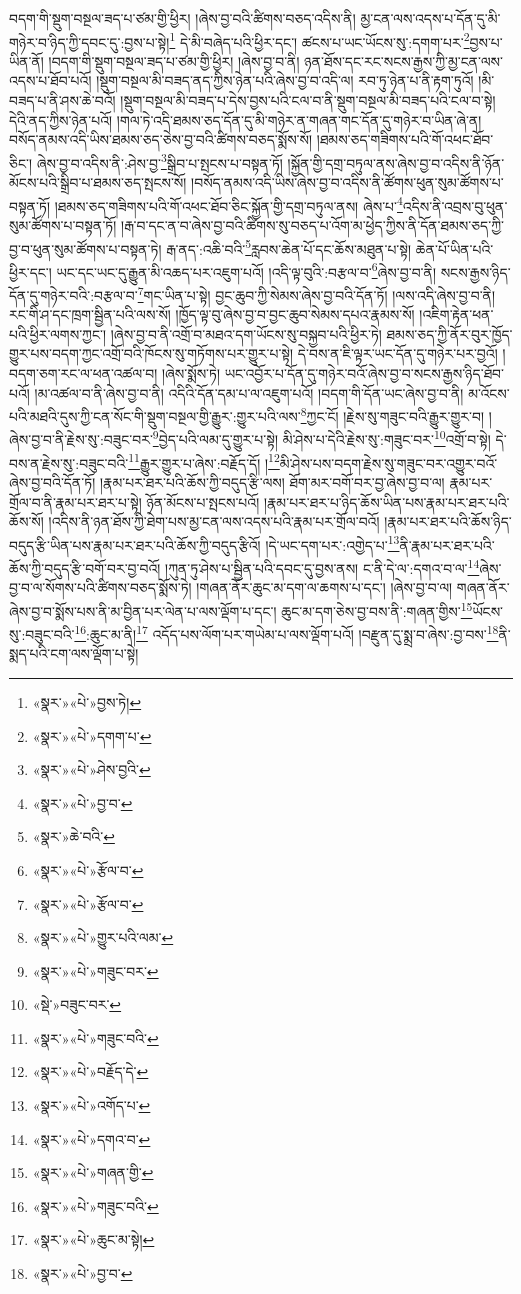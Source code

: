 བདག་གི་སྡུག་བསྔལ་ཟད་པ་ཙམ་གྱི་ཕྱིར། །ཞེས་བྱ་བའི་ཚིགས་བཅད་འདིས་ནི། མྱ་ངན་ལས་འདས་པ་དོན་དུ་མི་གཉེར་བ་ཉིད་ཀྱི་དབང་དུ་:བྱས་པ་སྟེ།\footnote{«སྣར་»«པེ་»བྱས་ཏེ།} དེ་མི་བཞེད་པའི་ཕྱིར་དང་། ཚངས་པ་ཡང་ཡོངས་སུ་:དགག་པར་\footnote{«སྣར་»«པེ་»དགག་པ་}བྱས་པ་ཡིན་ནོ། །བདག་གི་སྡུག་བསྔལ་ཟད་པ་ཙམ་གྱི་ཕྱིར། །ཞེས་བྱ་བ་ནི། ཉན་ཐོས་དང་རང་སངས་རྒྱས་ཀྱི་མྱ་ངན་ལས་འདས་པ་ཐོབ་པའོ། །སྡུག་བསྔལ་མི་བཟད་ནད་ཀྱིས་ཉེན་པའི་ཞེས་བྱ་བ་འདི་ལ། རབ་ཏུ་ཉེན་པ་ནི་རྟག་ཏུའོ། །མི་བཟད་པ་ནི་ཤས་ཆེ་བའོ། །སྡུག་བསྔལ་མི་བཟད་པ་དེས་བྱས་པའི་ངལ་བ་ནི་སྡུག་བསྔལ་མི་བཟད་པའི་ངལ་བ་སྟེ། དེའི་ནད་ཀྱིས་ཉེན་པའོ། །གལ་ཏེ་འདི་ཐམས་ཅད་དོན་དུ་མི་གཉེར་ན་གཞན་གང་དོན་དུ་གཉེར་བ་ཡིན་ཞེ་ན། བསོད་ནམས་འདི་ཡིས་ཐམས་ཅད་ཅེས་བྱ་བའི་ཚིགས་བཅད་སྨོས་སོ། །ཐམས་ཅད་གཟིགས་པའི་གོ་འཕང་ཐོབ་ཅིང་། ཞེས་བྱ་བ་འདིས་ནི་:ཤེས་བྱ་\footnote{«སྣར་»«པེ་»ཤེས་བྱའི་}སྒྲིབ་པ་སྤངས་པ་བསྟན་ཏོ། །སྐྱོན་གྱི་དགྲ་བཏུལ་ནས་ཞེས་བྱ་བ་འདིས་ནི་ཉོན་མོངས་པའི་སྒྲིབ་པ་ཐམས་ཅད་སྤངས་སོ། །བསོད་ནམས་འདི་ཡིས་ཞེས་བྱ་བ་འདིས་ནི་ཚོགས་ཕུན་སུམ་ཚོགས་པ་བསྟན་ཏོ། །ཐམས་ཅད་གཟིགས་པའི་གོ་འཕང་ཐོབ་ཅིང་སྐྱོན་གྱི་དགྲ་བཏུལ་ནས། ཞེས་པ་\footnote{«སྣར་»«པེ་»བྱ་བ་}འདིས་ནི་འབྲས་བུ་ཕུན་སུམ་ཚོགས་པ་བསྟན་ཏོ། །རྒ་བ་དང་ན་བ་ཞེས་བྱ་བའི་ཚིགས་སུ་བཅད་པ་འོག་མ་ཕྱེད་ཀྱིས་ནི་དོན་ཐམས་ཅད་ཀྱི་བྱ་བ་ཕུན་སུམ་ཚོགས་པ་བསྟན་ཏེ། རྒ་ནད་:འཆི་བའི་\footnote{«སྣར་»ཆེ་བའི་}རླབས་ཆེན་པོ་དང་ཆོས་མཐུན་པ་སྟེ། ཆེན་པོ་ཡིན་པའི་ཕྱིར་དང་། ཡང་དང་ཡང་དུ་རྒྱུན་མི་འཆད་པར་འཇུག་པའོ། །འདི་ལྟ་བུའི་:བརྩལ་བ་\footnote{«སྣར་»«པེ་»རྩོལ་བ་}ཞེས་བྱ་བ་ནི། སངས་རྒྱས་ཉིད་དོན་དུ་གཉེར་བའི་:བརྩལ་བ་\footnote{«སྣར་»«པེ་»རྩོལ་བ་}གང་ཡིན་པ་སྟེ། བྱང་ཆུབ་ཀྱི་སེམས་ཞེས་བྱ་བའི་དོན་ཏོ། །ལས་འདི་ཞེས་བྱ་བ་ནི། རང་གི་ཤ་དང་ཁྲག་སྦྱིན་པའི་ལས་སོ། །ཁྱོད་ལྟ་བུ་ཞེས་བྱ་བ་བྱང་ཆུབ་སེམས་དཔའ་རྣམས་སོ། །འཇིག་རྟེན་ཕན་པའི་ཕྱིར་ལགས་ཀྱང་། །ཞེས་བྱ་བ་ནི་འགྲོ་བ་མཐའ་དག་ཡོངས་སུ་བསྐྱབ་པའི་ཕྱིར་ཏེ། ཐམས་ཅད་ཀྱི་ནོར་བུར་ཁྱོད་གྱུར་པས་བདག་ཀྱང་འགྲོ་བའི་ཁོངས་སུ་གཏོགས་པར་གྱུར་པ་སྟེ། དེ་བས་ན་ཇི་ལྟར་ཡང་དོན་དུ་གཉེར་པར་བྱའོ། །བདག་ཅག་རང་ལ་ཕན་འཚལ་བ། །ཞེས་སྨོས་ཏེ། ཡང་འབྱོར་པ་དོན་དུ་གཉེར་བའོ་ཞེས་བྱ་བ་སངས་རྒྱས་ཉིད་ཐོབ་པའོ། །མ་འཚལ་བ་ནི་ཞེས་བྱ་བ་ནི། འདིའི་དོན་དམ་པ་ལ་འཇུག་པའོ། །བདག་གི་དོན་ཡང་ཞེས་བྱ་བ་ནི། མ་འོངས་པའི་མཐའི་དུས་ཀྱི་ངན་སོང་གི་སྡུག་བསྔལ་གྱི་རྒྱུར་:གྱུར་པའི་ལས་\footnote{«སྣར་»«པེ་»གྱུར་པའི་ལམ་}ཀྱང་ངོ། །རྗེས་སུ་གཟུང་བའི་རྒྱུར་གྱུར་བ། །ཞེས་བྱ་བ་ནི་རྗེས་སུ་:བཟུང་བར་\footnote{«སྣར་»«པེ་»གཟུང་བར་}བྱེད་པའི་ལམ་དུ་གྱུར་པ་སྟེ། མི་ཤེས་པ་དེའི་རྗེས་སུ་:གཟུང་བར་\footnote{«སྡེ་»བཟུང་བར་}འགྲོ་བ་སྟེ། དེ་བས་ན་རྗེས་སུ་:བཟུང་བའི་\footnote{«སྣར་»«པེ་»གཟུང་བའི་}རྒྱུར་གྱུར་པ་ཞེས་:བརྗོད་དོ། །\footnote{«སྣར་»«པེ་»བརྗོད་དེ་}མི་ཤེས་པས་བདག་རྗེས་སུ་གཟུང་བར་འགྱུར་བའོ་ཞེས་བྱ་བའི་དོན་ཏོ། །རྣམ་པར་ཐར་པའི་ཆོས་ཀྱི་བདུད་རྩི་ལས། ཐོག་མར་བགོ་བར་བྱ་ཞེས་བྱ་བ་ལ། རྣམ་པར་གྲོལ་བ་ནི་རྣམ་པར་ཐར་པ་སྟེ། ཉོན་མོངས་པ་སྤངས་པའོ། །རྣམ་པར་ཐར་པ་ཉིད་ཆོས་ཡིན་པས་རྣམ་པར་ཐར་པའི་ཆོས་སོ། །འདིས་ནི་ཉན་ཐོས་ཀྱི་ཐེག་པས་མྱ་ངན་ལས་འདས་པའི་རྣམ་པར་གྲོལ་བའོ། །རྣམ་པར་ཐར་པའི་ཆོས་ཉིད་བདུད་རྩི་ཡིན་པས་རྣམ་པར་ཐར་པའི་ཆོས་ཀྱི་བདུད་རྩིའོ། །དེ་ཡང་དག་པར་:འགྱེད་པ་\footnote{«སྣར་»«པེ་»འགོད་པ་}ནི་རྣམ་པར་ཐར་པའི་ཆོས་ཀྱི་བདུད་རྩི་བགོ་བར་བྱ་བའོ། །ཀུན་ཏུ་ཤེས་པ་སྦྱིན་པའི་དབང་དུ་བྱས་ནས། ང་ནི་དེ་ལ་:དགའ་བ་ལ་\footnote{«སྣར་»«པེ་»དགའ་བ་}ཞེས་བྱ་བ་ལ་སོགས་པའི་ཚིགས་བཅད་སྨོས་ཏེ། །གཞན་ནོར་ཆུང་མ་དག་ལ་ཆགས་པ་དང་། །ཞེས་བྱ་བ་ལ། གཞན་ནོར་ཞེས་བྱ་བ་སྨོས་པས་ནི་མ་བྱིན་པར་ལེན་པ་ལས་ལྡོག་པ་དང་། ཆུང་མ་དག་ཅེས་བྱ་བས་ནི་:གཞན་གྱིས་\footnote{«སྣར་»«པེ་»གཞན་གྱི་}ཡོངས་སུ་:བཟུང་བའི་\footnote{«སྣར་»«པེ་»གཟུང་བའི་}:ཆུང་མ་ནི།\footnote{«སྣར་»«པེ་»ཆུང་མ་སྟེ།} འདོད་པས་ལོག་པར་གཡེམ་པ་ལས་ལྡོག་པའོ། །བརྫུན་དུ་སྨྲ་བ་ཞེས་:བྱ་བས་\footnote{«སྣར་»«པེ་»བྱ་བ་}ནི་སྨད་པའི་ངག་ལས་ལྡོག་པ་སྟེ། 